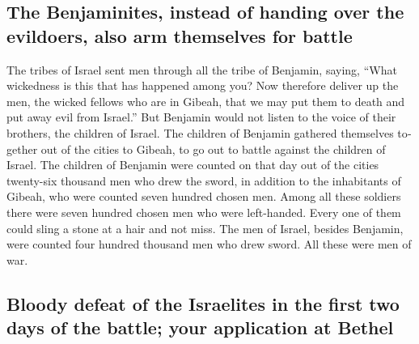 \begin{paracol}{2}
\begin{otherlanguage}{english}
\hypertarget{the-benjaminites-instead-of-handing-over-the-evildoers-also-arm-themselves-for-battle}{%
\subsection{The Benjaminites, instead of handing over the evildoers,
also arm themselves for
battle}\label{the-benjaminites-instead-of-handing-over-the-evildoers-also-arm-themselves-for-battle}}

 The tribes of Israel sent men through all the tribe of
Benjamin, saying, ``What wickedness is this that has happened among you?
 Now therefore deliver up the men, the wicked fellows who
are in Gibeah, that we may put them to death and put away evil from
Israel.'' But Benjamin would not listen to the voice of their brothers,
the children of Israel.  The children of Benjamin
gathered themselves together out of the cities to Gibeah, to go out to
battle against the children of Israel.  The children of
Benjamin were counted on that day out of the cities twenty-six thousand
men who drew the sword, in addition to the inhabitants of Gibeah, who
were counted seven hundred chosen men.  Among all these
soldiers there were seven hundred chosen men who were left-handed. Every
one of them could sling a stone at a hair and not miss. 
The men of Israel, besides Benjamin, were counted four hundred thousand
men who drew sword. All these were men of war.

\hypertarget{bloody-defeat-of-the-israelites-in-the-first-two-days-of-the-battle-your-application-at-bethel}{%
\subsection{Bloody defeat of the Israelites in the first two days of the
battle; your application at
Bethel}\label{bloody-defeat-of-the-israelites-in-the-first-two-days-of-the-battle-your-application-at-bethel}}


\end{otherlanguage}
\end{paracol}
